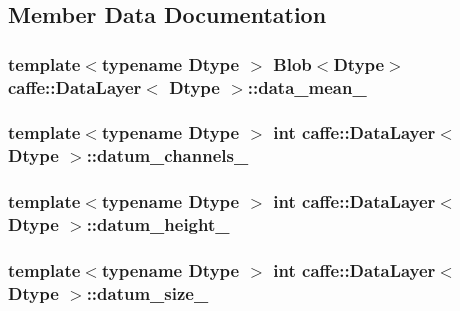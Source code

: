 \subsection{Member Data Documentation}
\hypertarget{classcaffe_1_1_data_layer_a83d1439647876032a72468a7a8c4b889}{
\subsubsection[{data\+\_\+mean\+\_\+}]{\setlength{\rightskip}{0pt plus 5cm}template$<$typename Dtype $>$ {\bf Blob}$<$Dtype$>$ {\bf caffe\+::\+Data\+Layer}$<$ Dtype $>$\+::data\+\_\+mean\+\_\+\hspace{0.3cm}{\ttfamily [protected]}}}\label{classcaffe_1_1_data_layer_a83d1439647876032a72468a7a8c4b889}
\hypertarget{classcaffe_1_1_data_layer_a33f86db700bff9553d05151c04a95e0d}{
\subsubsection[{datum\+\_\+channels\+\_\+}]{\setlength{\rightskip}{0pt plus 5cm}template$<$typename Dtype $>$ int {\bf caffe\+::\+Data\+Layer}$<$ Dtype $>$\+::datum\+\_\+channels\+\_\+\hspace{0.3cm}{\ttfamily [protected]}}}\label{classcaffe_1_1_data_layer_a33f86db700bff9553d05151c04a95e0d}
\hypertarget{classcaffe_1_1_data_layer_a05b52e5bbe760b831728f1f0c0bed60b}{
\subsubsection[{datum\+\_\+height\+\_\+}]{\setlength{\rightskip}{0pt plus 5cm}template$<$typename Dtype $>$ int {\bf caffe\+::\+Data\+Layer}$<$ Dtype $>$\+::datum\+\_\+height\+\_\+\hspace{0.3cm}{\ttfamily [protected]}}}\label{classcaffe_1_1_data_layer_a05b52e5bbe760b831728f1f0c0bed60b}
\hypertarget{classcaffe_1_1_data_layer_a9b2617e874504b7780584d869d461bf3}{
\subsubsection[{datum\+\_\+size\+\_\+}]{\setlength{\rightskip}{0pt plus 5cm}template$<$typename Dtype $>$ int {\bf caffe\+::\+Data\+Layer}$<$ Dtype $>$\+::datum\+\_\+size\+\_\+\hspace{0.3cm}{\ttfamily [protected]}}}\label{classcaffe_1_1_data_layer_a9b2617e874504b7780584d869d461bf3}
